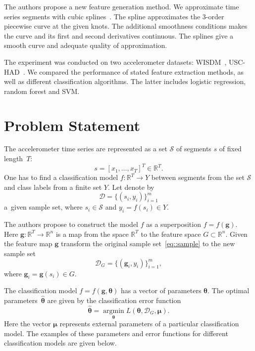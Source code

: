 \documentclass[a4paper,12pt]{article}
\newcommand{\argmin}{\mathop{\arg \min}\limits}
\begin{document}
The authors propose a new feature generation method. 
We approximate time series segments with cubic splines~\cite{deboor1978splines}. 
The spline approximates the 3-order piecewise curve at the given knots. The additional smoothness conditions makes the curve and its first and second derivatives continuous. The splines give a smooth curve and adequate quality of approximation.

The experiment was conducted on two accelerometer datasets: WISDM~\cite{wisdm}, USC-HAD~\cite{usc}. 
We compared the performance of stated feature extraction methods, as well as different classification algorithms. 
The latter includes logistic regression, random forest and SVM.

\section{Problem Statement}
The accelerometer time series are represented as a set $\mathcal{S}$ of segments $s$ of fixed length~$T$:
\begin{equation}
s = [x_1, \dots, x_T]^{T} \in \mathbb{R}^T.
\label{eq::time_series}
\end{equation}
One has to find a classification model $f: \mathbb{R}^T \rightarrow Y$ between segments from the set $\mathcal{S}$ and class labels from a finite set $Y$.
Let denote by 
\begin{equation}
	\mathcal{D} = \{(s_i, y_i)\}_{i=1}^m
	\label{eq::sample}
\end{equation}
a~given sample set, where $s_i \in \mathcal{S}$ and $y_i = f(s_i)\in Y$.

The authors propose to construct the model $f$ as a superposition $f=f(\boldsymbol{g})$.
Here $\boldsymbol{g}: \mathbb{R}^T \rightarrow \mathbb{R}^n$ is a map from the space $\mathbb{R}^{T} $ to the feature space $G \subset \mathbb{R}^n$.
Given the feature map $\boldsymbol{g}$ transform the original sample set~\eqref{eq::sample} to the new sample set
\[
	\mathcal{D}_G = \{(\boldsymbol{g}_i, y_i)\}_{i=1}^m,
\]
where $\boldsymbol{g}_i = \boldsymbol{g}(s_i) \in G$. 

The classification model $f=f(\boldsymbol{g}, \boldsymbol{\theta})$ has a vector of parameters $\boldsymbol{\theta}$. 
The optimal parameters~$\hat{\boldsymbol{\theta}}$ are given by the classification error function
\begin{equation}
\hat{\boldsymbol{\theta}} = \argmin_{\boldsymbol{\theta}} L(\boldsymbol{\theta}, \mathcal{D}_G, \boldsymbol{\mu}).
\label{eq::optimal_classification_params}
\end{equation}
Here the vector $\boldsymbol{\mu}$ represents external parameters of a particular classification model. The examples of these parameters and error functions for different classification models are given below.
\end{document}
